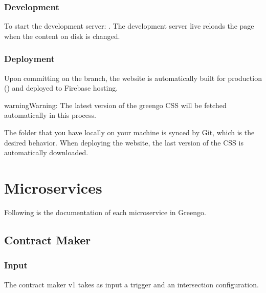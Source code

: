 \documentclass[letterpaper,10pt,english]{sphinxmanual}
\begin{document}
\subsection{Development}
\label{\detokenize{websites/greengo_sales:development}}
To start the development server: .
The development server live reloads the page when the content on disk is changed.


\subsection{Deployment}
\label{\detokenize{websites/greengo_sales:deployment}}
Upon committing on the  branch, the website is automatically built for production () and deployed to Firebase hosting.

\begin{sphinxadmonition}{warning}{Warning:}
The latest version of the greengo CSS will be fetched automatically in this process.

The folder  that you have locally on your machine is  synced by Git, which is the desired behavior.
When deploying the website, the last version of the CSS is automatically downloaded.
\end{sphinxadmonition}


\chapter{Microservices}
\label{\detokenize{microservices:microservices}}\label{\detokenize{microservices::doc}}
Following is the documentation of each microservice in Greengo.


\section{Contract Maker}
\label{\detokenize{microservices/contract_maker/index:contract-maker}}\label{\detokenize{microservices/contract_maker/index::doc}}

\subsection{Input}
\label{\detokenize{microservices/contract_maker/input:input}}\label{\detokenize{microservices/contract_maker/input::doc}}
The contract maker v1 takes as input a trigger and an intersection configuration.
\end{document}
